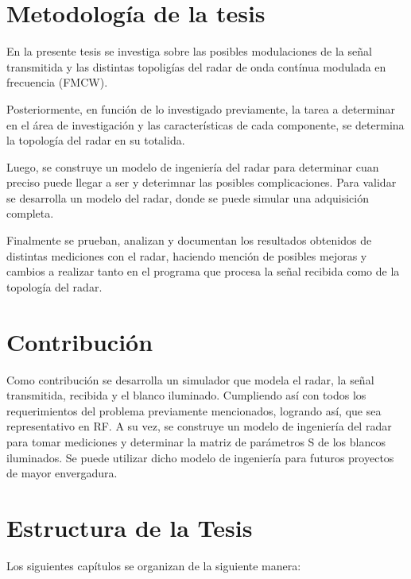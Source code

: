 \section{Metodología de la tesis} \label{sc:methodology}

En la presente tesis se investiga sobre las posibles modulaciones de la señal transmitida y las distintas topoligías del radar
de onda contínua modulada en frecuencia (FMCW).

Posteriormente, en función de lo investigado previamente, la tarea a determinar en el área de investigación y las 
características de cada componente, se determina la topología del radar en su totalida.

Luego, se construye un modelo de ingeniería del radar para determinar cuan preciso puede llegar a ser y deterimnar las posibles
complicaciones. Para validar se desarrolla un modelo del radar, donde se puede simular una adquisición completa. 

Finalmente se prueban, analizan y documentan los resultados obtenidos de distintas mediciones con el radar, haciendo mención de
posibles mejoras y cambios a realizar tanto en el programa que procesa la señal recibida como de la topología del radar.


\section{Contribución} \label{sc:contribution}

Como contribución se desarrolla un simulador que modela el radar, la señal transmitida, recibida y el blanco iluminado. 
Cumpliendo así con todos los requerimientos del problema previamente mencionados, logrando así, que sea representativo en RF.
A su vez, se construye un modelo de ingeniería del radar para tomar mediciones y determinar la matriz de parámetros S de los
blancos iluminados. Se puede utilizar dicho modelo de ingeniería para futuros proyectos de mayor envergadura. 


\section{Estructura de la Tesis} \label{sc:structure}

Los siguientes capítulos se organizan de la siguiente manera:

